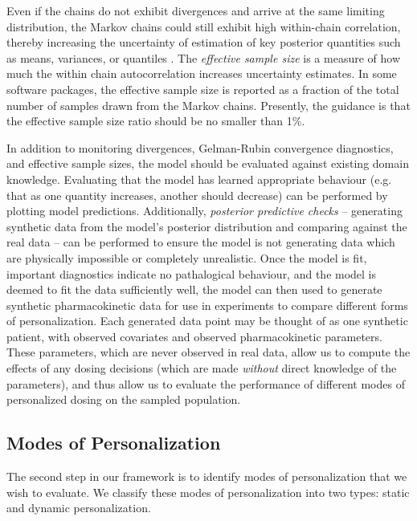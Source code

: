 Even if the chains do not exhibit divergences and arrive at the same limiting distribution, the Markov chains could still exhibit high within-chain correlation, thereby increasing the uncertainty of estimation of key posterior quantities such as means, variances, or quantiles \cite{brooks2011handbook}.  The \textit{effective sample size} is a measure of how much the within chain autocorrelation increases uncertainty estimates.  In some software packages, the effective sample size is reported as a fraction of the total number of samples drawn from the Markov chains.  Presently, the guidance is that the effective sample size ratio should be no smaller than 1\%.



In addition to monitoring divergences, Gelman-Rubin convergence diagnostics, and effective sample sizes, the model should be evaluated against existing domain knowledge.  Evaluating that the model has learned appropriate  behaviour (e.g. that as one quantity increases, another should decrease) can be performed by plotting model predictions.  Additionally, \textit{posterior predictive checks} -- generating synthetic data  from the model's posterior distribution and comparing against the real data -- can be performed to ensure the model is not generating data which are physically impossible or completely unrealistic. Once the model is fit, important diagnostics indicate no pathalogical behaviour, and the model is deemed to fit the data sufficiently well, the model can then used to generate synthetic pharmacokinetic data for use in experiments to compare different forms of personalization. Each generated data point may be thought of as one synthetic patient, with observed covariates and observed pharmacokinetic parameters. These parameters, which are never observed in real data, allow us to compute the effects of any dosing decisions (which are made \textit{without} direct knowledge of the parameters), and thus allow us to evaluate the performance of different modes of personalized dosing on the sampled population. 

\subsection{Modes of Personalization}

The second step in our framework is to identify modes of personalization that we wish to evaluate. We classify these modes of personalization into two types: static and dynamic personalization.

